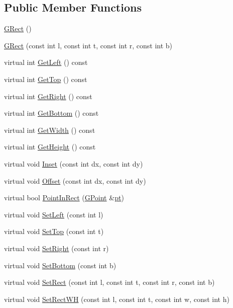 \subsection*{Public Member Functions}
\begin{DoxyCompactItemize}
\item 
\mbox{\hyperlink{class_g_rect_a66651711fd959d226869ba99a0a266c7}{G\+Rect}} ()
\item 
\mbox{\hyperlink{class_g_rect_a56121bc9d4825b0f9200a78d29357b71}{G\+Rect}} (const int l, const int t, const int r, const int b)
\item 
virtual int \mbox{\hyperlink{class_g_rect_a2095ad1d204b942a45bc8ed1546df937}{Get\+Left}} () const
\item 
virtual int \mbox{\hyperlink{class_g_rect_ac346895770ff4c98c672485a05819f55}{Get\+Top}} () const
\item 
virtual int \mbox{\hyperlink{class_g_rect_a3ba95d11e8a2760f1f7ba023dbfaf220}{Get\+Right}} () const
\item 
virtual int \mbox{\hyperlink{class_g_rect_a7c08ca62e8fbad3cfa1724384ee4921d}{Get\+Bottom}} () const
\item 
virtual int \mbox{\hyperlink{class_g_rect_af36a407452070f2e93a25dbafd3b4314}{Get\+Width}} () const
\item 
virtual int \mbox{\hyperlink{class_g_rect_a8d2b0a2c06688c2dad74bd0789f57d73}{Get\+Height}} () const
\item 
virtual void \mbox{\hyperlink{class_g_rect_a3b9d11354aad699f297dbfa7eb8196aa}{Inset}} (const int dx, const int dy)
\item 
virtual void \mbox{\hyperlink{class_g_rect_a7774fac9cd2ec8bee54a442e7ca18ebc}{Offset}} (const int dx, const int dy)
\item 
virtual bool \mbox{\hyperlink{class_g_rect_a49e5656acaa3f59acb7b0db70f455471}{Point\+In\+Rect}} (\mbox{\hyperlink{class_g_point}{G\+Point}} \&\mbox{\hyperlink{rings_8cpp_af69bbacaaf68a115b351c5d1e29c3cc8}{pt}})
\item 
virtual void \mbox{\hyperlink{class_g_rect_af8fab889fb03811f8ba166abfe2b9c01}{Set\+Left}} (const int l)
\item 
virtual void \mbox{\hyperlink{class_g_rect_a87864ea06d8f6796b296fd73ac3d1a95}{Set\+Top}} (const int t)
\item 
virtual void \mbox{\hyperlink{class_g_rect_a2293c5054272c0aba84624edf82b5b3b}{Set\+Right}} (const int r)
\item 
virtual void \mbox{\hyperlink{class_g_rect_a2ee1b00b28013fc219b27510a402433d}{Set\+Bottom}} (const int b)
\item 
virtual void \mbox{\hyperlink{class_g_rect_a1fd6fd632b6d3c068382766a0c18340f}{Set\+Rect}} (const int l, const int t, const int r, const int b)
\item 
virtual void \mbox{\hyperlink{class_g_rect_a6adcf2d50d9aaeaf18c304dc3ece0280}{Set\+Rect\+WH}} (const int l, const int t, const int w, const int h)
\end{DoxyCompactItemize}
